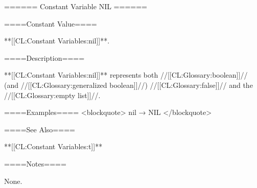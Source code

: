 ====== Constant Variable NIL ======

====Constant Value====

**[[CL:Constant Variables:nil]]**.

====Description====

**[[CL:Constant Variables:nil]]** represents both //[[CL:Glossary:boolean]]// (and //[[CL:Glossary:generalized boolean]]//) //[[CL:Glossary:false]]// and the //[[CL:Glossary:empty list]]//.

====Examples==== <blockquote> nil → NIL </blockquote>

====See Also====

**[[CL:Constant Variables:t]]**

====Notes====

None.

